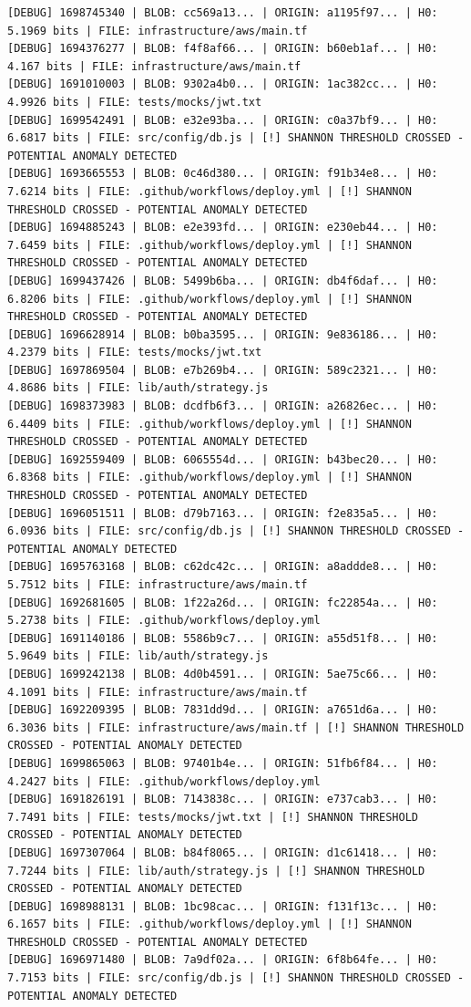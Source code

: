 \documentclass[12pt, a4paper, oneside]{report}
\begin{document}
\begin{lstlisting}[basicstyle=\tiny\ttfamily]
[DEBUG] 1698745340 | BLOB: cc569a13... | ORIGIN: a1195f97... | H0: 5.1969 bits | FILE: infrastructure/aws/main.tf
[DEBUG] 1694376277 | BLOB: f4f8af66... | ORIGIN: b60eb1af... | H0: 4.167 bits | FILE: infrastructure/aws/main.tf
[DEBUG] 1691010003 | BLOB: 9302a4b0... | ORIGIN: 1ac382cc... | H0: 4.9926 bits | FILE: tests/mocks/jwt.txt
[DEBUG] 1699542491 | BLOB: e32e93ba... | ORIGIN: c0a37bf9... | H0: 6.6817 bits | FILE: src/config/db.js | [!] SHANNON THRESHOLD CROSSED - POTENTIAL ANOMALY DETECTED
[DEBUG] 1693665553 | BLOB: 0c46d380... | ORIGIN: f91b34e8... | H0: 7.6214 bits | FILE: .github/workflows/deploy.yml | [!] SHANNON THRESHOLD CROSSED - POTENTIAL ANOMALY DETECTED
[DEBUG] 1694885243 | BLOB: e2e393fd... | ORIGIN: e230eb44... | H0: 7.6459 bits | FILE: .github/workflows/deploy.yml | [!] SHANNON THRESHOLD CROSSED - POTENTIAL ANOMALY DETECTED
[DEBUG] 1699437426 | BLOB: 5499b6ba... | ORIGIN: db4f6daf... | H0: 6.8206 bits | FILE: .github/workflows/deploy.yml | [!] SHANNON THRESHOLD CROSSED - POTENTIAL ANOMALY DETECTED
[DEBUG] 1696628914 | BLOB: b0ba3595... | ORIGIN: 9e836186... | H0: 4.2379 bits | FILE: tests/mocks/jwt.txt
[DEBUG] 1697869504 | BLOB: e7b269b4... | ORIGIN: 589c2321... | H0: 4.8686 bits | FILE: lib/auth/strategy.js
[DEBUG] 1698373983 | BLOB: dcdfb6f3... | ORIGIN: a26826ec... | H0: 6.4409 bits | FILE: .github/workflows/deploy.yml | [!] SHANNON THRESHOLD CROSSED - POTENTIAL ANOMALY DETECTED
[DEBUG] 1692559409 | BLOB: 6065554d... | ORIGIN: b43bec20... | H0: 6.8368 bits | FILE: .github/workflows/deploy.yml | [!] SHANNON THRESHOLD CROSSED - POTENTIAL ANOMALY DETECTED
[DEBUG] 1696051511 | BLOB: d79b7163... | ORIGIN: f2e835a5... | H0: 6.0936 bits | FILE: src/config/db.js | [!] SHANNON THRESHOLD CROSSED - POTENTIAL ANOMALY DETECTED
[DEBUG] 1695763168 | BLOB: c62dc42c... | ORIGIN: a8addde8... | H0: 5.7512 bits | FILE: infrastructure/aws/main.tf
[DEBUG] 1692681605 | BLOB: 1f22a26d... | ORIGIN: fc22854a... | H0: 5.2738 bits | FILE: .github/workflows/deploy.yml
[DEBUG] 1691140186 | BLOB: 5586b9c7... | ORIGIN: a55d51f8... | H0: 5.9649 bits | FILE: lib/auth/strategy.js
[DEBUG] 1699242138 | BLOB: 4d0b4591... | ORIGIN: 5ae75c66... | H0: 4.1091 bits | FILE: infrastructure/aws/main.tf
[DEBUG] 1692209395 | BLOB: 7831dd9d... | ORIGIN: a7651d6a... | H0: 6.3036 bits | FILE: infrastructure/aws/main.tf | [!] SHANNON THRESHOLD CROSSED - POTENTIAL ANOMALY DETECTED
[DEBUG] 1699865063 | BLOB: 97401b4e... | ORIGIN: 51fb6f84... | H0: 4.2427 bits | FILE: .github/workflows/deploy.yml
[DEBUG] 1691826191 | BLOB: 7143838c... | ORIGIN: e737cab3... | H0: 7.7491 bits | FILE: tests/mocks/jwt.txt | [!] SHANNON THRESHOLD CROSSED - POTENTIAL ANOMALY DETECTED
[DEBUG] 1697307064 | BLOB: b84f8065... | ORIGIN: d1c61418... | H0: 7.7244 bits | FILE: lib/auth/strategy.js | [!] SHANNON THRESHOLD CROSSED - POTENTIAL ANOMALY DETECTED
[DEBUG] 1698988131 | BLOB: 1bc98cac... | ORIGIN: f131f13c... | H0: 6.1657 bits | FILE: .github/workflows/deploy.yml | [!] SHANNON THRESHOLD CROSSED - POTENTIAL ANOMALY DETECTED
[DEBUG] 1696971480 | BLOB: 7a9df02a... | ORIGIN: 6f8b64fe... | H0: 7.7153 bits | FILE: src/config/db.js | [!] SHANNON THRESHOLD CROSSED - POTENTIAL ANOMALY DETECTED
\end{lstlisting}
\end{document}
